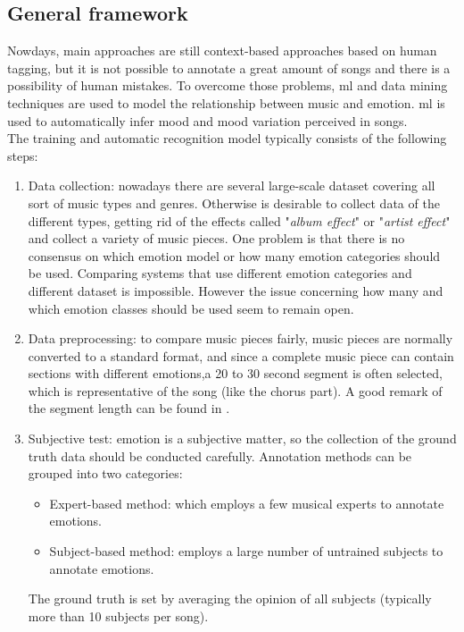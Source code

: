 \subsection{General framework}
Nowdays, main approaches are still context-based approaches based on human tagging, but it is not possible to annotate a great amount of songs and there is a possibility of human mistakes. To overcome those problems, \gls{ml} and data mining techniques are used to model the relationship between music and emotion. \gls{ml} is used to automatically infer mood and mood variation perceived in songs.
\\
The training and automatic recognition model typically consists of the following steps:
\begin{enumerate}
	\item Data collection: nowadays there are several large-scale dataset covering all sort of music types and genres. Otherwise is desirable to collect data of the different types, getting rid of the effects called "\textit{album effect}" or "\textit{artist effect}" and collect a variety of music pieces. One problem is that there is no consensus on which emotion model or how many emotion categories should be used. Comparing systems that use different emotion categories  and different dataset is impossible. However the issue concerning how many and which emotion classes should be used seem to remain open.
	\item Data preprocessing: to compare music pieces fairly, music pieces are normally converted to a standard format, and since a complete music piece can contain sections with different emotions,a 20 to 30 second segment is often selected, which is representative of the song (like the chorus part). A good remark of the segment length can be found in \cite{macdorman2007automatic}.
	\item Subjective test: emotion is a subjective matter, so the collection of the ground truth data should be conducted carefully. Annotation methods can be grouped into two categories:
	\begin{itemize}
		\item Expert-based method: which employs a few musical experts to annotate emotions.
		\item Subject-based method: employs a large number of untrained subjects to annotate emotions.
	\end{itemize}
	The ground truth is set by averaging the opinion of all subjects (typically more than 10 subjects per song).
	\\

\end{enumerate}
